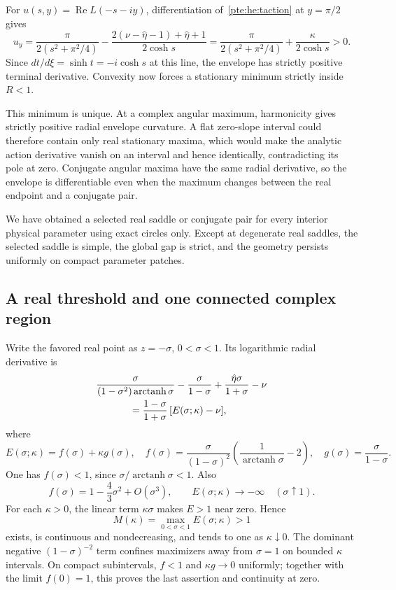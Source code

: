\documentclass[11pt,a4paper]{article}
\numberwithin{equation}{section}
\theoremstyle{definition}
\theoremstyle{plain}
\begin{document}
For $u(s,y)=\operatorname{Re}L(-s-iy)$, differentiation of~\eqref{pte:he:taction} at $y=\pi/2$ gives
\begin{equation}\label{pte:he:terminal}
 u_y=\frac{\pi}{2(s^2+\pi^2/4)}
 -\frac{2(\nu-\hat\eta-1)+\hat\eta+1}{2\cosh s}
 =\frac{\pi}{2(s^2+\pi^2/4)}+\frac\kappa{2\cosh s}>0.
\end{equation}
Since $dt/d\xi=\sinh t=-i\cosh s$ at this line, the envelope has strictly positive terminal derivative. Convexity now forces a stationary minimum strictly inside $R<1$.

This minimum is unique. At a complex angular maximum, harmonicity gives strictly positive radial envelope curvature. A flat zero-slope interval could therefore contain only real stationary maxima, which would make the analytic action derivative vanish on an interval and hence identically, contradicting its pole at zero. Conjugate angular maxima have the same radial derivative, so the envelope is differentiable even when the maximum changes between the real endpoint and a conjugate pair.

We have obtained a selected real saddle or conjugate pair for every interior physical parameter using exact circles only. Except at degenerate real saddles, the selected saddle is simple, the global gap is strict, and the geometry persists uniformly on compact parameter patches.

\subsection{A real threshold and one connected complex region}\label{pte:sec:he-real}
Write the favored real point as $z=-\sigma $, $0<\sigma <1$. Its logarithmic radial derivative is
\begin{align}
 &\frac{\sigma }{(1-\sigma ^2)\operatorname{arctanh}\sigma }
       -\frac \sigma {1-\sigma }+\frac{\hat\eta \sigma }{1+\sigma }-\nu\notag\\
 &\hspace{12mm}=\frac{1-\sigma }{1+\sigma }\,[E(\sigma ;\kappa)-\nu],\label{pte:he:realderivative}
\end{align}
where
\begin{equation}\label{pte:he:realmap}
 E(\sigma ;\kappa)=f(\sigma )+\kappa g(\sigma ),\quad
 f(\sigma )=\frac \sigma {(1-\sigma )^2}\left(\frac1{\operatorname{arctanh}\sigma }-2\right),\quad
 g(\sigma )=\frac \sigma {1-\sigma }.
\end{equation}
One has $f(\sigma )<1$, since $\sigma /\operatorname{arctanh}\sigma <1$. Also
\[
 f(\sigma )=1-\frac43\sigma ^2+O(\sigma ^3),\qquad
 E(\sigma ;\kappa)\longrightarrow-\infty\quad(\sigma \uparrow1).
\]
For each $\kappa>0$, the linear term $\kappa \sigma $ makes $E>1$ near zero. Hence
\begin{equation}\label{pte:he:threshold}
 M(\kappa)=\max_{0<\sigma <1}E(\sigma ;\kappa)>1
\end{equation}
exists, is continuous and nondecreasing, and tends to one as $\kappa\downarrow0$. The dominant negative $(1-\sigma )^{-2}$ term confines maximizers away from $\sigma =1$ on bounded $\kappa$ intervals. On compact subintervals, $f<1$ and $\kappa g\to0$ uniformly; together with the limit $f(0)=1$, this proves the last assertion and continuity at zero.
\end{document}
